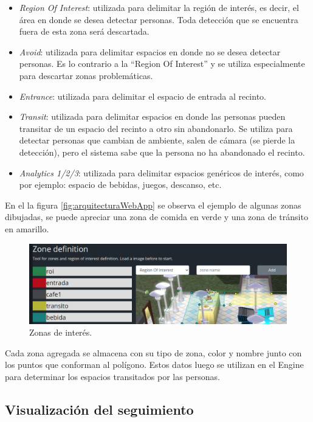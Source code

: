 \begin{itemize}
\item \textit{Region Of Interest}: utilizada para delimitar la región de interés, es decir, el área en donde se desea detectar personas. Toda detección que se encuentra fuera de esta zona será descartada.
\item \textit{Avoid}: utilizada para delimitar espacios en donde no se desea detectar personas. Es lo contrario a la ``Region Of Interest'' y se utiliza especialmente para descartar zonas problemáticas.
\item \textit{Entrance}: utilizada para delimitar el espacio de entrada al recinto.
\item \textit{Transit}: utilizada para delimitar espacios en donde las personas pueden transitar de un espacio del recinto a otro sin abandonarlo. Se utiliza para detectar personas que cambian de ambiente, salen de cámara (se pierde la detección), pero el sistema sabe que la persona no ha abandonado el recinto.
\item \textit{Analytics 1/2/3}: utilizada para delimitar espacios genéricos de interés, como por ejemplo: espacio de bebidas, juegos, descanso, etc.
\end{itemize}

En el la figura \ref{fig:arquitecturaWebApp} se observa el ejemplo de algunas zonas dibujadas, se puede apreciar una zona de comida en verde y una zona de tránsito en amarillo.

\begin{figure}[ht]
	\centering
	\includegraphics[scale=.5]{./Figures/visualizacionZonas.png}
	\caption{Zonas de interés.}
	\label{fig:visualizacionZonas}
\end{figure}

Cada zona agregada se almacena con su tipo de zona, color y nombre junto con los puntos que conforman al polígono. Estos datos luego se utilizan en el Engine para determinar los espacios transitados por las personas.

\newpage

\subsection{Visualización del seguimiento}

